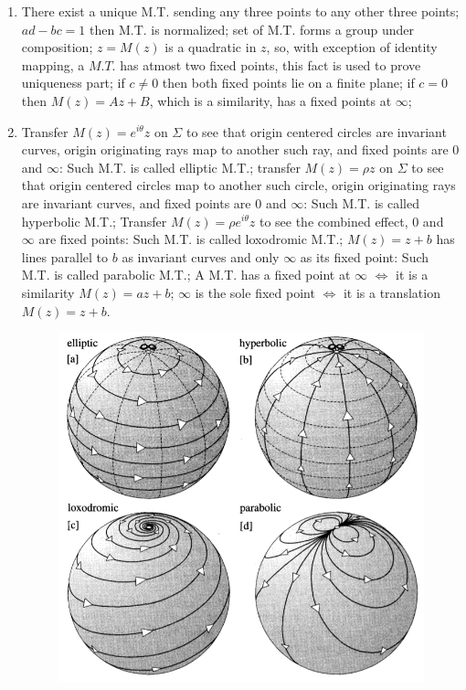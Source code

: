 \documentclass[12pt]{article}
\begin{document}
\begin{enumerate}
    \item There exist a unique M.T. sending any three points to any other three points; $ad-bc=1$ then M.T. is normalized; set of M.T. forms a group under composition; $z=M(z)$ is a quadratic in $z$, so, with exception of identity mapping, a $M.T.$ has atmost two fixed points, this fact is used to prove uniqueness part; if $c \neq 0$ then both fixed points lie on a finite plane; if $c = 0$ then $M(z) = Az+B$, which is a similarity, has a fixed points at $\infty$;
    
    \item Transfer $M(z) = e^{i\theta}z$ on $\Sigma$ to see that origin centered circles are invariant curves, origin originating rays map to another such ray, and fixed points are $0$ and $\infty$: Such M.T. is called elliptic M.T.; transfer $M(z) = \rho z$ on $\Sigma$ to see that origin centered circles map to another such circle, origin originating rays are invariant curves, and fixed points are $0$ and $\infty$: Such M.T. is called hyperbolic M.T.; Transfer $M(z) = \rho e^{i\theta}z$ to see the combined effect, $0$ and $\infty$ are fixed points: Such M.T. is called loxodromic M.T.; $M(z) = z+b$ has lines parallel to $b$ as invariant curves and only $\infty$ as its fixed point: Such M.T. is called parabolic M.T.; A M.T. has a fixed point at $\infty$ $\iff$ it is a similarity $M(z) = az+b$; $\infty$ is the sole fixed point $\iff$ it is a translation $M(z) = z+b$.
    
    \begin{figure}[h!]
        \centering
        \includegraphics[scale=0.7]{fig_18}
        \label{f18}
    \end{figure}
    

\end{enumerate}
\end{document}
